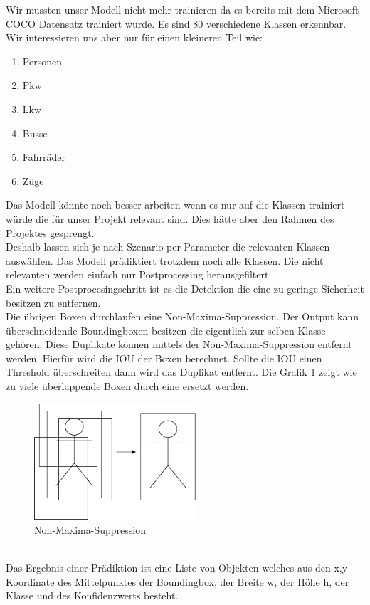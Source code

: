 \documentclass[conference]{IEEEtran}
\begin{document}
	Wir mussten unser Modell nicht mehr trainieren da es bereits mit dem Microsoft COCO Datensatz trainiert wurde. Es sind 80 verschiedene Klassen erkennbar. Wir interessieren uns aber nur für einen kleineren Teil wie:
	\begin{enumerate}
		\item Personen
		\item Pkw
		\item Lkw
		\item Busse
		\item Fahrräder
		\item Züge
	\end{enumerate}
	Das Modell könnte noch besser arbeiten wenn es nur auf die Klassen trainiert würde die für unser Projekt relevant sind. Dies hätte aber den Rahmen des Projektes gesprengt.\\
	Deshalb lassen sich je nach Szenario per Parameter die relevanten Klassen auswählen. Das Modell prädiktiert trotzdem noch alle Klassen. Die nicht relevanten werden einfach nur Postprocessing herausgefiltert.\\
	Ein weitere Postprocesingschritt ist es die Detektion die eine zu geringe Sicherheit besitzen zu entfernen.\\
	Die übrigen Boxen durchlaufen eine Non-Maxima-Suppression.
	Der Output kann überschneidende Boundingboxen besitzen die eigentlich zur selben Klasse gehören. Diese Duplikate können mittels der Non-Maxima-Suppression entfernt werden. Hierfür wird die IOU der Boxen berechnet. Sollte die IOU einen Threshold überschreiten dann wird das Duplikat entfernt. Die Grafik \ref{NMS} zeigt wie zu viele überlappende Boxen durch eine ersetzt werden.\\
	\begin{figure}[!h]
		\begin{center}
			\includegraphics[width=6cm]{Media/NMS.png}
			\caption{Non-Maxima-Suppression}
			\label{NMS}
		\end{center}
	\end{figure}\\
	Das Ergebnis einer Prädiktion ist eine Liste von Objekten welches aus den x,y Koordinate des Mittelpunktes der Boundingbox, der Breite w, der Höhe h, der Klasse und des Konfidenzwerts besteht.
	
\end{document}
